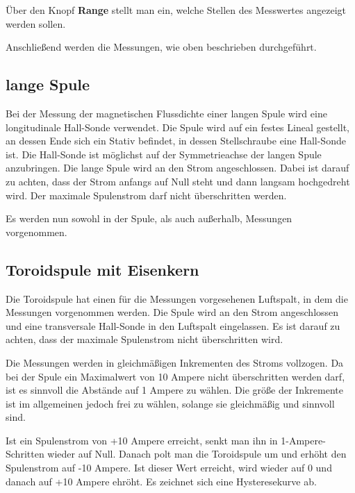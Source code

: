 Über den Knopf \textbf{Range} stellt man ein, welche Stellen des Messwertes angezeigt werden sollen.

Anschließend werden die Messungen, wie oben beschrieben durchgeführt.

\subsection{lange Spule}

Bei der Messung der magnetischen Flussdichte einer langen Spule wird eine longitudinale Hall-Sonde verwendet.
Die Spule wird auf ein festes Lineal gestellt, an dessen Ende sich ein Stativ befindet, in dessen Stellschraube eine Hall-Sonde ist.
Die Hall-Sonde ist möglichst auf der Symmetrieachse der langen Spule anzubringen. 
Die lange Spule wird an den Strom angeschlossen. Dabei ist darauf zu achten, dass der Strom anfangs auf Null steht und dann langsam hochgedreht
wird. Der maximale Spulenstrom darf nicht überschritten werden.

Es werden nun sowohl in der Spule, als auch außerhalb, Messungen vorgenommen.

\subsection{Toroidspule mit Eisenkern}
Die Toroidspule hat einen für die Messungen vorgesehenen Luftspalt, in dem die Messungen vorgenommen werden. Die Spule wird an den Strom
angeschlossen und eine transversale Hall-Sonde in den Luftspalt eingelassen. Es ist darauf zu achten, dass der maximale Spulenstrom nicht überschritten
wird.

Die Messungen werden in gleichmäßigen Inkrementen des Stroms vollzogen. Da bei der Spule ein Maximalwert von 10 Ampere nicht überschritten werden
darf, ist es sinnvoll die Abstände auf 1 Ampere zu wählen. Die größe der Inkremente ist im allgemeinen jedoch frei zu wählen, solange sie gleichmäßig
und sinnvoll sind.

Ist ein Spulenstrom von +10 Ampere erreicht, senkt man ihn in 1-Ampere-Schritten wieder auf Null. Danach polt man die Toroidspule um und
erhöht den Spulenstrom auf -10 Ampere. Ist dieser Wert erreicht, wird wieder auf 0 und danach auf +10 Ampere ehröht.
Es zeichnet sich eine Hysteresekurve ab.